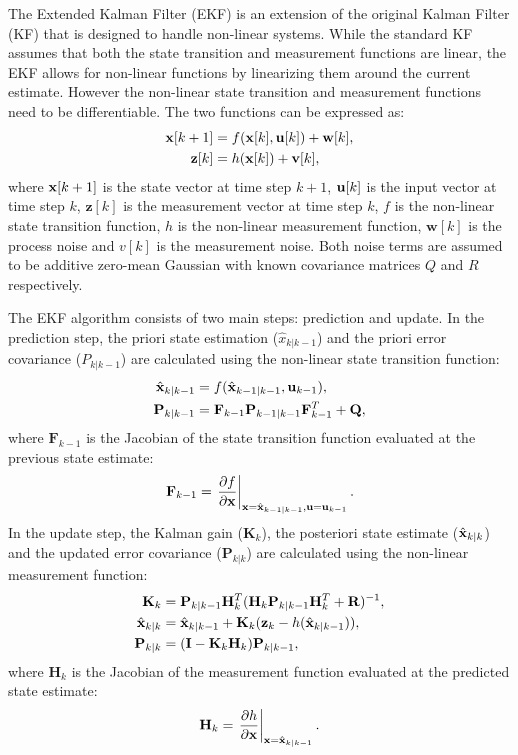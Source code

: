 The Extended Kalman Filter (EKF) is an extension of the original Kalman Filter (KF) that is designed to handle non-linear systems. While the standard KF assumes that both the state transition and measurement functions are linear, the EKF allows for non-linear functions by linearizing them around the current estimate. However the non-linear state transition and measurement functions need to be differentiable. The two functions can be expressed as:
\begin{align}
    \mathbf{x}[k+1] &= f(\mathbf{x}[k], \mathbf{u}[k]) + \mathbf{w}[k], \\
    \mathbf{z}[k] &= h(\mathbf{x}[k]) + \mathbf{v}[k],
\end{align}
where $\mathbf{x}[k+1]$ is the state vector at time step $k+1$, $\mathbf{u}[k]$ is the input vector at time step $k$, $\mathbf{z}[k]$ is the measurement vector at time step $k$, $f$ is the non-linear state transition function, $h$ is the non-linear measurement function, $\mathbf{w}[k]$ is the process noise and $v[k]$ is the measurement noise. Both noise terms are assumed to be additive zero-mean Gaussian with known covariance matrices $Q$ and $R$ respectively.

The EKF algorithm consists of two main steps: prediction and update. In the prediction step, the priori state estimation ($\hat{x}_{k|k-1}$) and the priori error covariance ($P_{k|k-1}$) are calculated using the non-linear state transition function:
\begin{align}
    \hat{\mathbf{x}}_{k|k-1} &= f(\hat{\mathbf{x}}_{k-1|k-1}, \mathbf{u}_{k-1}), \\
    \mathbf{P}_{k|k-1} &= \mathbf{F}_{k-1} \mathbf{P}_{k-1|k-1} \mathbf{F}_{k-1}^T + \mathbf{Q},
\end{align}
where $\mathbf{F}_{k-1}$ is the Jacobian of the state transition function evaluated at the previous state estimate:
\begin{equation}
    \mathbf{F}_{k-1} = \left. \frac{\partial f}{\partial \mathbf{x}} \right|_{\mathbf{x}=\hat{\mathbf{x}}_{k-1|k-1}, \mathbf{u}=\mathbf{u}_{k-1}}.
\end{equation}
In the update step, the Kalman gain ($\mathbf{K}_k$), the posteriori state estimate ($\hat{\mathbf{x}}_{k|k}$) and the updated error covariance ($\mathbf{P}_{k|k}$) are calculated using the non-linear measurement function:
\begin{align}
    \mathbf{K}_k &= \mathbf{P}_{k|k-1} \mathbf{H}_k^T (\mathbf{H}_k \mathbf{P}_{k|k-1} \mathbf{H}_k^T + \mathbf{R})^{-1}, \\
    \hat{\mathbf{x}}_{k|k} &= \hat{\mathbf{x}}_{k|k-1} + \mathbf{K}_k (\mathbf{z}_k - h(\hat{\mathbf{x}}_{k|k-1})), \\
    \mathbf{P}_{k|k} &= (\mathbf{I} - \mathbf{K}_k \mathbf{H}_k) \mathbf{P}_{k|k-1},
\end{align}
where $\mathbf{H}_k$ is the Jacobian of the measurement function evaluated at the predicted state estimate:
\begin{equation}
    \mathbf{H}_k = \left. \frac{\partial h}{\partial \mathbf{x}} \right|_{\mathbf{x}=\hat{\mathbf{x}}_{k|k-1}}.
\end{equation}

